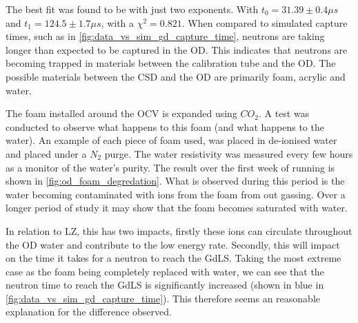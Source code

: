 

\clearpage



\clearpage



\clearpage
\par
The best fit was found to be with just two exponents.
With $t_0 = 31.39 \pm 0.4\mu s$ and $t_1 = 124.5 \pm 1.7\mu s$, with a $\chi^2=0.821$.
When compared to simulated capture times, such as in \autoref{fig:data_vs_sim_gd_capture_time}, neutrons are taking longer than expected to be captured in the OD.
This indicates that neutrons are becoming trapped in materials between the calibration tube and the OD.
The possible materials between the CSD and the OD are primarily foam, acrylic and water.
\par
The foam installed around the OCV is expanded using $CO_2$.
A test was conducted to observe what happens to this foam (and what happens to the water).
An example of each piece of foam used, was placed in de-ionised water and placed under a $N_2$ purge. 
The water resistivity was measured every few hours as a monitor of the water's purity.
The result over the first week of running is shown in \autoref{fig:od_foam_degredation}.
What is observed during this period is the water becoming contaminated with ions from the foam from out gassing.
Over a longer period of study it may show that the foam becomes saturated with water.
\par
In relation to LZ, this has two impacts, firstly these ions can circulate throughout the OD water and contribute to the low energy rate.
Secondly, this will impact on the time it takes for a neutron to reach the GdLS.
Taking the most extreme case as the foam being completely replaced with water, we can see that the neutron time to reach the GdLS is significantly increased (shown in blue in \autoref{fig:data_vs_sim_gd_capture_time}).
This therefore seems an reasonable explanation for the difference observed.




